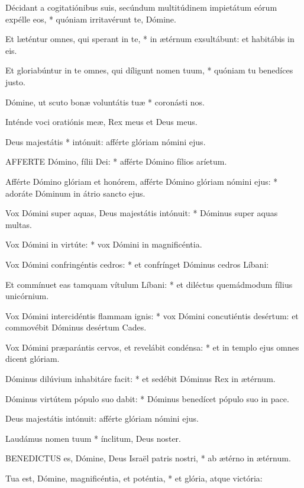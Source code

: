 Décidant a cogitatiónibus suis, secúndum multitúdinem impietátum eórum expélle eos, * quóniam irritavérunt te, Dómine.

Et læténtur omnes, qui sperant in te, * in ætérnum exsultábunt: et habitábis in eis.

Et gloriabúntur in te omnes, qui díligunt nomen tuum, * quóniam tu benedíces justo.

Dómine, ut scuto bonæ voluntátis tuæ * coronásti nos.

 Inténde voci oratiónis meæ, Rex meus et Deus meus.

 Deus majestátis * intónuit: afférte glóriam nómini ejus.


\lettrine[lines=2]{A}{FFERTE} Dómino, fílii Dei: * afférte Dómino fílios aríetum.

Afférte Dómino glóriam et honórem, afférte Dómino glóriam nómini ejus: * adoráte Dóminum in átrio sancto ejus.

Vox Dómini super aquas, Deus majestátis intónuit: * Dóminus super aquas multas.

Vox Dómini in virtúte: * vox Dómini in magnificéntia.

Vox Dómini confringéntis cedros: * et confrínget Dóminus cedros Líbani:

Et commínuet eas tamquam vítulum Líbani: * et diléctus quemádmodum fílius unicórnium.

Vox Dómini intercidéntis flammam ignis: * vox Dómini concutiéntis desértum: et commovébit Dóminus desértum Cades.

Vox Dómini præparántis cervos, et revelábit condénsa: * et in templo ejus omnes dicent glóriam.

Dóminus dilúvium inhabitáre facit: * et sedébit Dóminus Rex in ætérnum.

Dóminus virtútem pópulo suo dabit: * Dóminus benedícet pópulo suo in pace.

 Deus majestátis intónuit: afférte glóriam nómini ejus.

 Laudámus nomen tuum * ínclitum, Deus noster.


\lettrine[lines=2]{B}{ENEDICTUS} es, Dómine, Deus Israël patris nostri, * ab ætérno in ætérnum.

Tua est, Dómine, magnificéntia, et poténtia, * et glória, atque victória:

